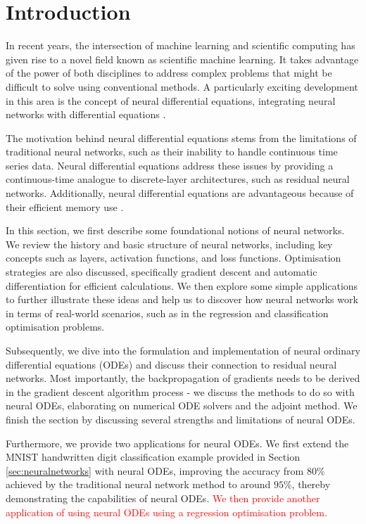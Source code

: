 \documentclass[a4paper,11pt,titlepage]{article}
\theoremstyle{definition}
\theoremstyle{plain}
\theoremstyle{remark}
\begin{document}
\section{Introduction}

In recent years, the intersection of machine learning and scientific computing has given rise to a novel field known as scientific machine learning. It takes advantage of the power of both disciplines to address complex problems that might be difficult to solve using conventional methods. A particularly exciting development in this area is the concept of neural differential equations, integrating neural networks with differential equations \cite{chen2018neural}.

The motivation behind neural differential equations stems from the limitations of traditional neural networks, such as their inability to handle continuous time series data. Neural differential equations address these issues by providing a continuous-time analogue to discrete-layer architectures, such as residual neural networks. Additionally, neural differential equations are advantageous because of their efficient memory use \cite{haoxuan2023}.

In this section, we first describe some foundational notions of neural networks. We review the history and basic structure of neural networks, including key concepts such as layers, activation functions, and loss functions. Optimisation strategies are also discussed, specifically gradient descent and automatic differentiation for efficient calculations. We then explore some simple applications to further illustrate these ideas and help us to discover how neural networks work in terms of real-world scenarios, such as in the regression and classification optimisation problems.

Subsequently, we dive into the formulation and implementation of neural ordinary differential equations (ODEs) and discuss their connection to residual neural networks. Most importantly, the backpropagation of gradients needs to be derived in the gradient descent algorithm process - we discuss the methods to do so with neural ODEs, elaborating on numerical ODE solvers and the adjoint method. We finish the section by discussing several strengths and limitations of neural ODEs.

Furthermore, we provide two applications for neural ODEs. We first extend the MNIST handwritten digit classification example provided in Section \ref{sec:neuralnetworks} with neural ODEs, improving the accuracy from $80\%$ achieved by the traditional neural network method to around $95\%$, thereby demonstrating the capabilities of neural ODEs. \textcolor{red}{We then provide another application of using neural ODEs using a regression optimisation problem.}
\end{document}
